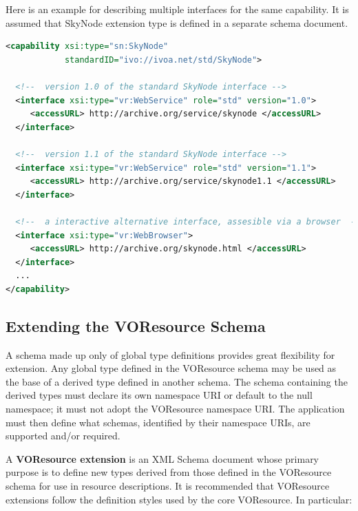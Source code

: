 \documentclass[11pt,a4paper]{ivoa}
\begin{document}
Here is an example for describing multiple interfaces for the same
capability. It is assumed that SkyNode extension type is defined in a
separate schema document.

\begin{lstlisting}[language=XML]
<capability xsi:type="sn:SkyNode"
            standardID="ivo://ivoa.net/std/SkyNode">

  <!--  version 1.0 of the standard SkyNode interface --> 
  <interface xsi:type="vr:WebService" role="std" version="1.0">
     <accessURL> http://archive.org/service/skynode </accessURL>
  </interface>

  <!--  version 1.1 of the standard SkyNode interface --> 
  <interface xsi:type="vr:WebService" role="std" version="1.1">
     <accessURL> http://archive.org/service/skynode1.1 </accessURL>
  </interface>

  <!--  a interactive alternative interface, assesible via a browser  --> 
  <interface xsi:type="vr:WebBrowser">
     <accessURL> http://archive.org/skynode.html </accessURL>
  </interface>
  ...
</capability>
\end{lstlisting}


\subsection{Extending the VOResource Schema}

\label{sect:extending}

A schema made up only of global type definitions provides great
flexibility for extension.  Any global type defined in the VOResource
schema may be used as the base of a derived type defined in another
schema.  The schema containing the derived types must declare its own
namespace URI or default to the null namespace; it must not adopt the
VOResource namespace URI.  The application must then define what
schemas, identified by their namespace URIs, are supported and/or
required.  



A \textbf{VOResource extension} is an XML Schema document whose primary
purpose is to define new types derived from those defined in the
VOResource schema for use in resource descriptions.  It is recommended
that VOResource extensions follow the definition styles used by the core
VOResource.  In particular: 
\end{document}
